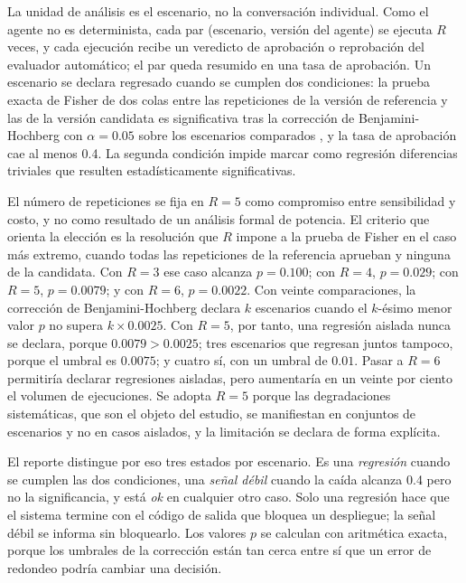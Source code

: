 La unidad de análisis es el escenario, no la conversación individual. Como el agente no es determinista, cada par (escenario, versión del agente) se ejecuta $R$ veces, y cada ejecución recibe un veredicto de aprobación o reprobación del evaluador automático; el par queda resumido en una tasa de aprobación. Un escenario se declara regresado cuando se cumplen dos condiciones: la prueba exacta de Fisher de dos colas entre las repeticiones de la versión de referencia y las de la versión candidata es significativa tras la corrección de Benjamini-Hochberg con $\alpha = 0.05$ sobre los escenarios comparados \cite{benjamini1995fdr}, y la tasa de aprobación cae al menos 0.4. La segunda condición impide marcar como regresión diferencias triviales que resulten estadísticamente significativas.
\par
El número de repeticiones se fija en $R = 5$ como compromiso entre sensibilidad y costo, y no como resultado de un análisis formal de potencia. El criterio que orienta la elección es la resolución que $R$ impone a la prueba de Fisher en el caso más extremo, cuando todas las repeticiones de la referencia aprueban y ninguna de la candidata. Con $R = 3$ ese caso alcanza $p = 0.100$; con $R = 4$, $p = 0.029$; con $R = 5$, $p = 0.0079$; y con $R = 6$, $p = 0.0022$. Con veinte comparaciones, la corrección de Benjamini-Hochberg declara $k$ escenarios cuando el $k$-ésimo menor valor $p$ no supera $k \times 0.0025$. Con $R = 5$, por tanto, una regresión aislada nunca se declara, porque $0.0079 > 0.0025$; tres escenarios que regresan juntos tampoco, porque el umbral es $0.0075$; y cuatro sí, con un umbral de $0.01$. Pasar a $R = 6$ permitiría declarar regresiones aisladas, pero aumentaría en un veinte por ciento el volumen de ejecuciones. Se adopta $R = 5$ porque las degradaciones sistemáticas, que son el objeto del estudio, se manifiestan en conjuntos de escenarios y no en casos aislados, y la limitación se declara de forma explícita.
\par
El reporte distingue por eso tres estados por escenario. Es una \textit{regresión} cuando se cumplen las dos condiciones, una \textit{señal débil} cuando la caída alcanza 0.4 pero no la significancia, y está \textit{ok} en cualquier otro caso. Solo una regresión hace que el sistema termine con el código de salida que bloquea un despliegue; la señal débil se informa sin bloquearlo. Los valores $p$ se calculan con aritmética exacta, porque los umbrales de la corrección están tan cerca entre sí que un error de redondeo podría cambiar una decisión.

